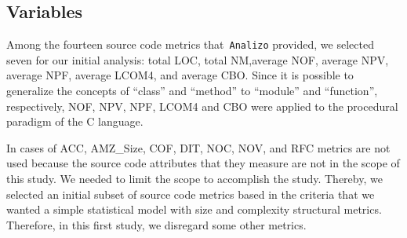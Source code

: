 \documentclass[conference]{IEEEtran}
\newcommand{\TODO}[1]{{\color{red}\textbf{\uwave{#1}}}}
\begin{document}
\subsection{Variables}
\label{variables}

Among the fourteen source code metrics that~\texttt{Analizo} provided, 
we selected seven for our initial analysis: 
%
total LOC, total NM,average NOF, average NPV, average NPF, average LCOM4,
and average CBO.
%
Since it is possible to generalize the concepts of ``class'' and ``method''
to ``module'' and ``function'', respectively, NOF, NPV, NPF, LCOM4 and CBO 
were applied to the procedural paradigm of the C language. 

In cases of ACC, AMZ\_Size, COF, DIT, NOC, NOV, and RFC metrics are not used 
because the source code attributes that they measure are not in the scope of this study.
%
We needed to limit the scope to accomplish the study. Thereby, we selected an initial 
subset of source code metrics based in the criteria that we wanted a simple
statistical model with size and complexity structural metrics. 
%
Therefore, in this first study, we disregard some other metrics.
\end{document}
